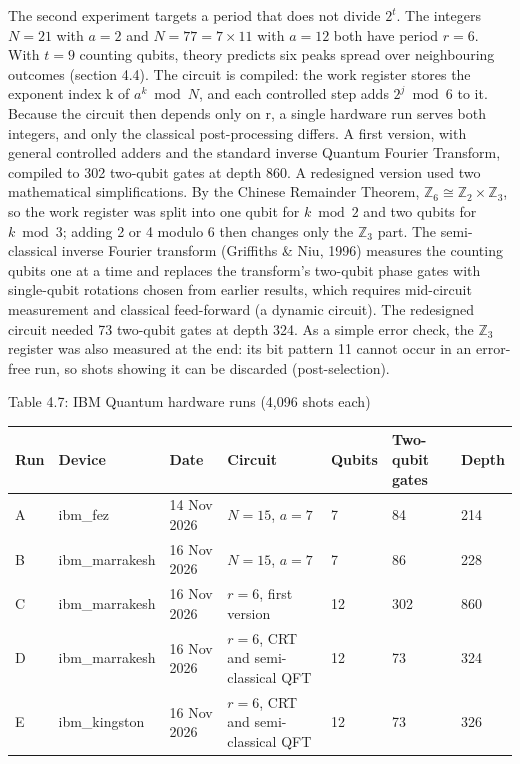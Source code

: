 \documentclass[12pt,oneside]{report}
\begin{document}
The second experiment targets a period that does not divide $2^{t}$. The integers $N = 21$ with $a = 2$ and $N = 77 = 7 \times 11$ with $a = 12$ both have period $r = 6$. With $t = 9$ counting qubits, theory predicts six peaks spread over neighbouring outcomes (section 4.4). The circuit is compiled: the work register stores the exponent index k of $a^{k} \bmod N$, and each controlled step adds $2^{j} \bmod 6$ to it. Because the circuit then depends only on r, a single hardware run serves both integers, and only the classical post-processing differs. A first version, with general controlled adders and the standard inverse Quantum Fourier Transform, compiled to 302 two-qubit gates at depth 860. A redesigned version used two mathematical simplifications. By the Chinese Remainder Theorem, $\mathbb{Z}_{6} \cong \mathbb{Z}_{2} \times \mathbb{Z}_{3}$, so the work register was split into one qubit for $k \bmod 2$ and two qubits for $k \bmod 3$; adding 2 or 4 modulo 6 then changes only the $\mathbb{Z}_{3}$ part. The semi-classical inverse Fourier transform (Griffiths \& Niu, 1996) measures the counting qubits one at a time and replaces the transform's two-qubit phase gates with single-qubit rotations chosen from earlier results, which requires mid-circuit measurement and classical feed-forward (a dynamic circuit). The redesigned circuit needed 73 two-qubit gates at depth 324. As a simple error check, the $\mathbb{Z}_{3}$ register was also measured at the end: its bit pattern 11 cannot occur in an error-free run, so shots showing it can be discarded (post-selection).
\par

\label{tab:4.7}Table 4.7: IBM Quantum hardware runs (4,096 shots each)
\par

\begin{center}\small\begin{tabularx}{\textwidth}{|P{0.06\textwidth}|W|W|W|P{0.09\textwidth}|P{0.12\textwidth}|P{0.08\textwidth}|}\hline
Run & Device & Date & Circuit & Qubits & Two-qubit gates & Depth \\\hline
A & ibm\_fez & 14 Nov 2026 & $N = 15$, $a = 7$ & 7 & 84 & 214 \\\hline
B & ibm\_marrakesh & 16 Nov 2026 & $N = 15$, $a = 7$ & 7 & 86 & 228 \\\hline
C & ibm\_marrakesh & 16 Nov 2026 & $r = 6$, first version & 12 & 302 & 860 \\\hline
D & ibm\_marrakesh & 16 Nov 2026 & $r = 6$, CRT and semi-classical QFT & 12 & 73 & 324 \\\hline
E & ibm\_kingston & 16 Nov 2026 & $r = 6$, CRT and semi-classical QFT & 12 & 73 & 326 \\\hline\end{tabularx}\end{center}
\end{document}
